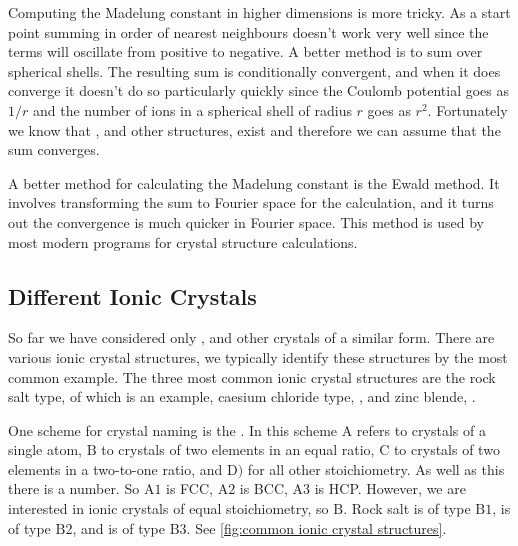 \documentclass[fleqn]{NotesClass}
\begin{document}
    Computing the Madelung constant in higher dimensions is more tricky.
    As a start point summing in order of nearest neighbours doesn't work very well since the terms will oscillate from positive to negative.
    A better method is to sum over spherical shells.
    The resulting sum is conditionally convergent, and when it does converge it doesn't do so particularly quickly since the Coulomb potential goes as \(1/r\) and the number of ions in a spherical shell of radius \(r\) goes as \(r^2\).
    Fortunately we know that , and other structures, exist and therefore we can assume that the sum converges.
    
    A better method for calculating the Madelung constant is the Ewald method.
    It involves transforming the sum to Fourier space for the calculation, and it turns out the convergence is much quicker in Fourier space.
    This method is used by most modern programs for crystal structure calculations.
    
    \subsection{Different Ionic Crystals}
    So far we have considered only , and other crystals of a similar form.
    There are various ionic crystal structures, we typically identify these structures by the most common example.
    The three most common ionic crystal structures are the rock salt type, of which  is an example, caesium chloride type, , and zinc blende, .
    
    One scheme for crystal naming is the .
    In this scheme \(\mathrm{A}\) refers to crystals of a single atom, \(\mathrm{B}\) to crystals of two elements in an equal ratio, \(\mathrm{C}\) to crystals of two elements in a two-to-one ratio, and \(\mathrm{D})\) for all other stoichiometry.
    As well as this there is a number.
    So \(\mathrm{A1}\) is FCC, \(\mathrm{A2}\) is BCC, \(\mathrm{A3}\) is HCP.
    However, we are interested in ionic crystals of equal stoichiometry, so \(\mathrm{B}\).
    Rock salt is of type \(\mathrm{B1}\),  is of type \(\mathrm{B2}\), and  is of type \(\mathrm{B3}\).
    See \cref{fig:common ionic crystal structures}.
    
\end{document}
